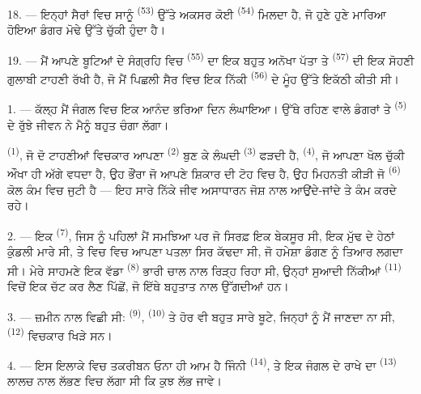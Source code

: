 18. --- ਇਨ੍ਹਾਂ ਸੈਰਾਂ ਵਿਚ ਸਾਨੂੰ  \textsuperscript{(53)} ਉੱਤੇ ਅਕਸਰ
ਕੋਈ  \textsuperscript{(54)} ਮਿਲਦਾ ਹੈ, ਜੋ ਹੁਣੇ ਹੁਣੇ ਮਾਰਿਆ
ਹੋਇਆ ਡੰਗਰ ਮੋਢੇ ਉੱਤੇ ਚੁੱਕੀ ਹੁੰਦਾ ਹੈ।

19. --- ਮੈਂ ਆਪਣੇ ਬੂਟਿਆਂ ਦੇ ਸੰਗ੍ਰਹਿ ਵਿਚ  \textsuperscript{(55)} ਦਾ ਇਕ
ਬਹੁਤ ਅਨੋਖਾ ਪੱਤਾ ਤੇ  \textsuperscript{(57)} ਦੀ ਇਕ ਸੋਹਣੀ ਗੁਲਾਬੀ ਟਾਹਣੀ
ਰੱਖੀ ਹੈ, ਜੋ ਮੈਂ ਪਿਛਲੀ ਸੈਰ ਵਿਚ ਇਕ ਨਿੱਕੀ  \textsuperscript{(56)} ਦੇ ਮੂੰਹ
ਉੱਤੇ ਇਕੱਠੀ ਕੀਤੀ ਸੀ।

\VUsaut{3.0mm}
\VUsaut{3.0mm}

\VUsaut{3.0mm}

1. --- ਕੱਲ੍ਹ ਮੈਂ ਜੰਗਲ ਵਿਚ ਇਕ ਆਨੰਦ ਭਰਿਆ ਦਿਨ ਲੰਘਾਇਆ। ਉੱਥੇ ਰਹਿਣ ਵਾਲੇ ਡੰਗਰਾਂ ਤੇ
 \textsuperscript{(5)} ਦੇ ਰੁੱਝੇ ਜੀਵਨ ਨੇ ਮੈਨੂੰ ਬਹੁਤ ਚੰਗਾ ਲੱਗਾ।

 \textsuperscript{(1)}, ਜੋ ਦੋ ਟਾਹਣੀਆਂ ਵਿਚਕਾਰ ਆਪਣਾ 
\textsuperscript{(2)} ਬੁਣ ਕੇ ਲੰਘਦੀ  \textsuperscript{(3)} ਫੜਦੀ ਹੈ,
 \textsuperscript{(4)}, ਜੋ ਆਪਣਾ ਖੋਲ ਚੁੱਕੀ ਔਖਾ ਹੀ ਅੱਗੇ ਵਧਦਾ ਹੈ, ਉਹ
ਭੌਂਰਾ ਜੋ ਆਪਣੇ ਸ਼ਿਕਾਰ ਦੀ ਟੋਹ ਵਿਚ ਹੈ, ਉਹ ਮਿਹਨਤੀ ਕੀੜੀ ਜੋ 
\textsuperscript{(6)} ਕੋਲ ਕੰਮ ਵਿਚ ਜੁਟੀ ਹੈ — ਇਹ ਸਾਰੇ ਨਿੱਕੇ ਜੀਵ ਅਸਾਧਾਰਨ ਜੋਸ਼ ਨਾਲ
ਆਉਂਦੇ-ਜਾਂਦੇ ਤੇ ਕੰਮ ਕਰਦੇ ਰਹੇ।

2. --- ਇਕ  \textsuperscript{(7)}, ਜਿਸ ਨੂੰ ਪਹਿਲਾਂ ਮੈਂ 
ਸਮਝਿਆ ਪਰ ਜੋ ਸਿਰਫ਼ ਇਕ ਬੇਕਸੂਰ  ਸੀ, ਇਕ ਮੁੱਢ ਦੇ ਹੇਠਾਂ ਕੁੰਡਲੀ ਮਾਰੇ
ਸੀ, ਤੇ ਵਿਚ ਵਿਚ ਆਪਣਾ ਪਤਲਾ ਸਿਰ ਕੱਢਦਾ ਸੀ, ਜੋ ਹਮੇਸ਼ਾ ਡੰਗਣ ਨੂੰ ਤਿਆਰ ਲਗਦਾ ਸੀ। ਮੇਰੇ
ਸਾਹਮਣੇ ਇਕ ਵੱਡਾ  \textsuperscript{(8)} ਭਾਰੀ ਚਾਲ ਨਾਲ ਰਿੜ੍ਹ ਰਿਹਾ ਸੀ,
ਉਨ੍ਹਾਂ ਸੁਆਦੀ ਨਿੱਕੀਆਂ  \textsuperscript{(11)} ਵਿਚੋਂ ਇਕ
ਚੱਟ ਕਰ ਲੈਣ ਪਿੱਛੋਂ, ਜੋ ਇੱਥੇ ਬਹੁਤਾਤ ਨਾਲ ਉੱਗਦੀਆਂ ਹਨ।

3. --- ਜ਼ਮੀਨ  ਨਾਲ ਵਿਛੀ ਸੀ: 
\textsuperscript{(9)},  \textsuperscript{(10)} ਤੇ ਹੋਰ ਵੀ ਬਹੁਤ ਸਾਰੇ
ਬੂਟੇ, ਜਿਨ੍ਹਾਂ ਨੂੰ ਮੈਂ ਜਾਣਦਾ ਨਾ ਸੀ,  \textsuperscript{(12)}
ਵਿਚਕਾਰ ਖਿੜੇ ਸਨ।

4. --- ਇਸ ਇਲਾਕੇ ਵਿਚ  ਤਕਰੀਬਨ ਓਨਾ ਹੀ ਆਮ ਹੈ ਜਿੰਨੀ 
\textsuperscript{(14)}, ਤੇ ਇਕ ਜੰਗਲ ਦੇ ਰਾਖੇ ਦਾ 
\textsuperscript{(13)} ਲਾਲਚ ਨਾਲ ਲੱਭਣ ਵਿਚ ਲੱਗਾ ਸੀ ਕਿ ਕੁਝ ਲੱਭ ਜਾਵੇ।

\VUsaut{3.0mm}
\VUsaut{3.0mm}

